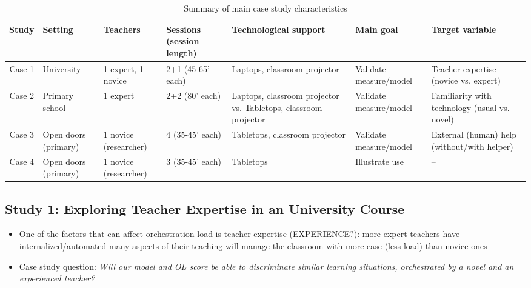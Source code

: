 \documentclass[10pt,journal,compsoc]{IEEEtran}
\begin{document}
\begin{table}[!t]
\caption{Summary of main case study characteristics}
\label{tab:cases}
\centering
\begin{tabular}{|c||p{1.5cm}|p{1.5cm}|p{2cm}|p{3.4cm}|p{2cm}|p{3.4cm}|}
\hline
Study & Setting & Teachers & Sessions (session length) & Technological support & Main goal & Target variable\\
\hline
\hline
Case 1 & University & 1 expert, 1 novice & 2+1 (45-65' each) & Laptops, classroom projector & Validate measure/model & Teacher expertise (novice vs. expert) \\
\hline
Case 2 & Primary school & 1 expert & 2+2 (80' each) & Laptops, classroom projector vs. Tabletops, classroom projector & Validate measure/model & Familiarity with technology (usual vs. novel) \\
\hline
Case 3 & Open doors (primary) & 1 novice (researcher) & 4 (35-45' each) & Tabletops, classroom projector & Validate measure/model & External (human) help (without/with helper) \\
\hline
Case 4 & Open doors (primary) & 1 novice (researcher) & 3 (35-45' each) & Tabletops & Illustrate use & -- \\
\hline
\end{tabular}
\end{table}



\subsection{Study 1: Exploring Teacher Expertise in an University Course}
\label{sec:study1}
\begin{itemize}
\item One of the factors that can affect orchestration load is teacher expertise (EXPERIENCE?): more expert teachers have internalized/automated many aspects of their teaching \cite{prieto2011recurrent,feldon2007cognitive} will manage the classroom with more ease (less load) than novice ones
\item Case study question: \textit{Will our model and OL score be able to discriminate similar learning situations, orchestrated by a novel and an experienced teacher?}
\end{itemize}
\end{document}

